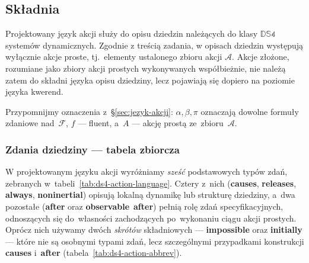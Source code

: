 \documentclass[11pt,a4paper]{article}
\newcommand{\causes}{\textbf{causes}}
\newcommand{\initially}{\textbf{initially}}
\newcommand{\always}{\textbf{always}}
\newcommand{\impossible}{\textbf{impossible}}
\newcommand{\releases}{\textbf{releases}}
\newcommand{\noninertial}{\textbf{noninertial}}
\newcommand{\observable}{\textbf{observable}}
\theoremstyle{definition}
\begin{document}
\subsection{Składnia}
\label{sec:skladnia-akcji}

Projektowany język akcji służy do opisu dziedzin należących do klasy $\mathbb{DS4}$ systemów dynamicznych. Zgodnie z treścią zadania, w opisach dziedzin występują wyłącznie akcje proste, tj.\ elementy ustalonego zbioru akcji $\mathcal{A}$. Akcje złożone, rozumiane jako zbiory akcji prostych wykonywanych współbieżnie, nie należą zatem do składni języka opisu dziedziny, lecz pojawiają się dopiero na poziomie języka kwerend.

Przypomnijmy oznaczenia z~\S\ref{sec:jezyk-akcji}: $\alpha,\beta,\pi$ oznaczają dowolne formuły zdaniowe nad~$\mathcal{F}$, $f$ --- fluent, a~$A$ --- akcję prostą ze~zbioru~$\mathcal{A}$.

\subsubsection{Zdania dziedziny --- tabela zbiorcza}

W projektowanym języku akcji wyróżniamy \emph{sześć} podstawowych typów zdań, zebranych w~tabeli~\ref{tab:ds4-action-language}. Cztery z~nich (\causes{}, \releases{}, \always{}, \noninertial{}) opisują lokalną dynamikę lub strukturę dziedziny, a~dwa pozostałe (\textbf{after} oraz \observable{}~\textbf{after}) pełnią rolę zdań specyfikacyjnych, odnoszących się do~własności zachodzących po~wykonaniu ciągu akcji prostych. Oprócz nich używamy dwóch \emph{skrótów} składniowych --- \impossible{} oraz \initially{} --- które nie są osobnymi typami zdań, lecz szczególnymi przypadkami konstrukcji \causes{} i~\textbf{after} (tabela~\ref{tab:ds4-action-abbrev}).
\end{document}
